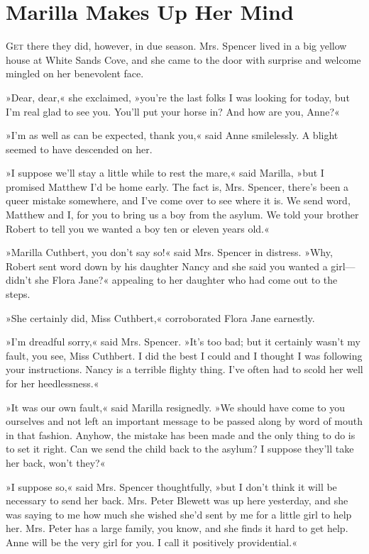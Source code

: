 \chapter{Marilla Makes Up Her Mind}

\lettrine[lines=4]{G}{et} there they did, however, in due season. Mrs. Spencer lived in a big yellow house at White Sands Cove, and she came to the door with surprise and welcome mingled on her benevolent face.

\zz
»Dear, dear,« she exclaimed, »you’re the last folks I was looking for today, but I’m real glad to see you. You’ll put your horse in? And how are you, Anne?«

»I’m as well as can be expected, thank you,« said Anne smilelessly. A blight seemed to have descended on her.

»I suppose we’ll stay a little while to rest the mare,« said Marilla, »but I promised Matthew I’d be home early. The fact is, Mrs. Spencer, there’s been a queer mistake somewhere, and I’ve come over to see where it is. We send word, Matthew and I, for you to bring us a boy from the asylum. We told your brother Robert to tell you we wanted a boy ten or eleven years old.«

»Marilla Cuthbert, you don’t say so!« said Mrs. Spencer in distress. »Why, Robert sent word down by his daughter Nancy and she said you wanted a girl—didn’t she Flora Jane?« appealing to her daughter who had come out to the steps.

»She certainly did, Miss Cuthbert,« corroborated Flora Jane earnestly.

»I’m dreadful sorry,« said Mrs. Spencer. »It’s too bad; but it certainly wasn’t my fault, you see, Miss Cuthbert. I did the best I could and I thought I was following your instructions. Nancy is a terrible flighty thing. I’ve often had to scold her well for her heedlessness.«

»It was our own fault,« said Marilla resignedly. »We should have come to you ourselves and not left an important message to be passed along by word of mouth in that fashion. Anyhow, the mistake has been made and the only thing to do is to set it right. Can we send the child back to the asylum? I suppose they’ll take her back, won’t they?«

»I suppose so,« said Mrs. Spencer thoughtfully, »but I don’t think it will be necessary to send her back. Mrs. Peter Blewett was up here yesterday, and she was saying to me how much she wished she’d sent by me for a little girl to help her. Mrs. Peter has a large family, you know, and she finds it hard to get help. Anne will be the very girl for you. I call it positively providential.«

